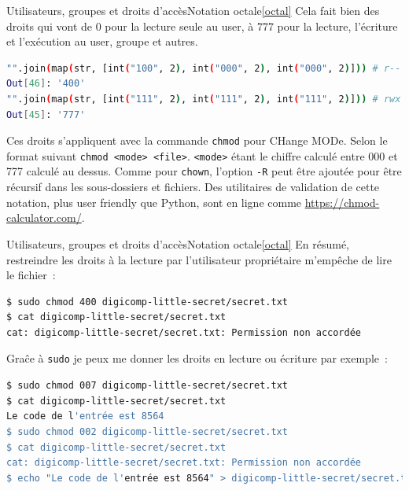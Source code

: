 \documentclass{beamer}
\begin{document}
    \begin{frame}[fragile]{Utilisateurs, groupes et droits d'accès}{Notation octale\cref{octal}}
        Cela fait bien des droits qui vont de 0 pour la lecture seule au user, à 777 pour la lecture, l'écriture et l'exécution au user, groupe et autres.
        \begin{lstlisting}[language=bash]
"".join(map(str, [int("100", 2), int("000", 2), int("000", 2)])) # r-- pour user
Out[46]: '400'
"".join(map(str, [int("111", 2), int("111", 2), int("111", 2)])) # rwx pour tous
Out[45]: '777'
        \end{lstlisting}
        Ces droits s'appliquent avec la commande \lstinline{chmod} pour CHange MODe.
        Selon le format suivant \lstinline{chmod <mode> <file>}.
        \lstinline{<mode>} étant le chiffre calculé entre 000 et 777 calculé au dessus.
        Comme pour \lstinline{chown}, l'option \lstinline{-R} peut être ajoutée pour être récursif dans les sous-dossiers et fichiers.
        \bigbreak
        Des utilitaires de validation de cette notation, plus user friendly que Python, sont en ligne comme \url{https://chmod-calculator.com/}.
    \end{frame}

    \begin{frame}[fragile]{Utilisateurs, groupes et droits d'accès}{Notation octale\cref{octal}}
        En résumé, restreindre les droits à la lecture par l'utilisateur propriétaire m'empêche de lire le fichier~:
        \begin{lstlisting}[language=bash]
$ sudo chmod 400 digicomp-little-secret/secret.txt
$ cat digicomp-little-secret/secret.txt
cat: digicomp-little-secret/secret.txt: Permission non accordée
        \end{lstlisting}
        Graĉe à \lstinline{sudo} je peux me donner les droits en lecture ou écriture par exemple~:
        \begin{lstlisting}[language=bash]
$ sudo chmod 007 digicomp-little-secret/secret.txt
$ cat digicomp-little-secret/secret.txt
Le code de l'entrée est 8564
$ sudo chmod 002 digicomp-little-secret/secret.txt
$ cat digicomp-little-secret/secret.txt
cat: digicomp-little-secret/secret.txt: Permission non accordée
$ echo "Le code de l'entrée est 8564" > digicomp-little-secret/secret.txt
        \end{lstlisting}
    \end{frame}
\end{document}
